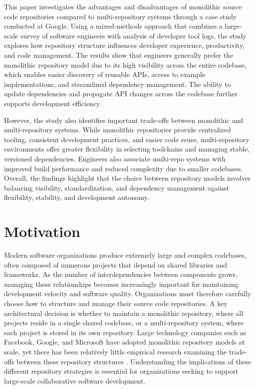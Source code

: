 This paper investigates the advantages and disadvantages of monolithic source code repositories compared to multi-repository systems through a case study conducted at Google. Using a mixed-methods approach that combines a large-scale survey of software engineers with analysis of developer tool logs, the study explores how repository structure influences developer experience, productivity, and code management. The results show that engineers generally prefer the monolithic repository model due to its high visibility across the entire codebase, which enables easier discovery of reusable APIs, access to example implementations, and streamlined dependency management. The ability to update dependencies and propagate API changes across the codebase further supports development efficiency.

However, the study also identifies important trade-offs between monolithic and multi-repository systems. While monolithic repositories provide centralized tooling, consistent development practices, and easier code reuse, multi-repository environments offer greater flexibility in selecting toolchains and managing stable, versioned dependencies. Engineers also associate multi-repo systems with improved build performance and reduced complexity due to smaller codebases. Overall, the findings highlight that the choice between repository models involves balancing visibility, standardization, and dependency management against flexibility, stability, and development autonomy.

\section{Motivation}

Modern software organizations produce extremely large and complex codebases, often composed of numerous projects that depend on shared libraries and frameworks. As the number of interdependencies between components grows, managing these relationships becomes increasingly important for maintaining development velocity and software quality. Organizations must therefore carefully choose how to structure and manage their source code repositories. A key architectural decision is whether to maintain a monolithic repository, where all projects reside in a single shared codebase, or a multi-repository system, where each project is stored in its own repository. Large technology companies such as Facebook, Google, and Microsoft have adopted monolithic repository models at scale, yet there has been relatively little empirical research examining the trade-offs between these repository structures \cite{goode2014scaling,harry2017scaling,potvin2016google}. Understanding the implications of these different repository strategies is essential for organizations seeking to support large-scale collaborative software development.


